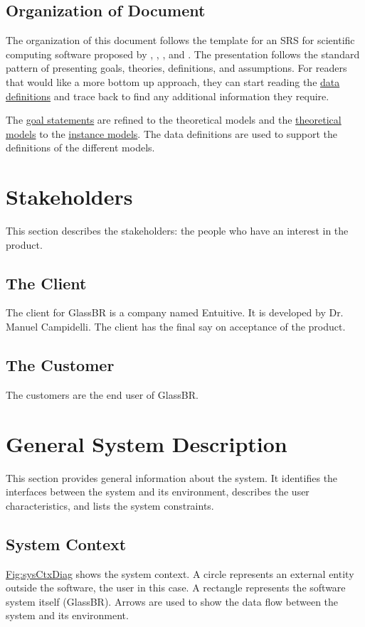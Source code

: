\documentclass[12pt]{article}
\begin{document}
\subsection{Organization of Document}
\label{Sec:DocOrg}
The organization of this document follows the template for an SRS for scientific computing software proposed by \cite{koothoor2013}, \cite{smithLai2005}, \cite{smithEtAl2007}, and \cite{smithKoothoor2016}. The presentation follows the standard pattern of presenting goals, theories, definitions, and assumptions. For readers that would like a more bottom up approach, they can start reading the \hyperref[Sec:IMs]{data definitions} and trace back to find any additional information they require.

The \hyperref[Sec:GoalStmt]{goal statements} are refined to the theoretical models and the \hyperref[Sec:TMs]{theoretical models} to the \hyperref[Sec:IMs]{instance models}. The data definitions are used to support the definitions of the different models.

\section{Stakeholders}
\label{Sec:Stakeholder}
This section describes the stakeholders: the people who have an interest in the product.

\subsection{The Client}
\label{Sec:Client}
The client for GlassBR is a company named Entuitive. It is developed by Dr. Manuel Campidelli. The client has the final say on acceptance of the product.

\subsection{The Customer}
\label{Sec:Customer}
The customers are the end user of GlassBR.

\section{General System Description}
\label{Sec:GenSysDesc}
This section provides general information about the system. It identifies the interfaces between the system and its environment, describes the user characteristics, and lists the system constraints.

\subsection{System Context}
\label{Sec:SysContext}
\hyperref[Figure:sysCtxDiag]{Fig:sysCtxDiag} shows the system context. A circle represents an external entity outside the software, the user in this case. A rectangle represents the software system itself (GlassBR). Arrows are used to show the data flow between the system and its environment.
\end{document}

